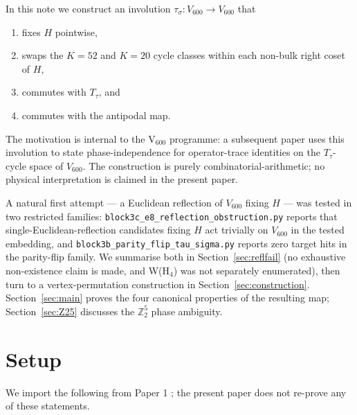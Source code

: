 \documentclass[11pt]{article}
\newcommand{\Vsixhundred}{V_{600}}
\newcommand{\sigmaG}{\sigma}
\newcommand{\tausigma}{\tau_{\!\sigmaG}}
\newcommand{\Ttau}{T_{\tau}}
\begin{document}
In this note we construct an involution
$\tausigma : \Vsixhundred \to \Vsixhundred$ that

\begin{enumerate}[leftmargin=2em]
\item fixes $H$ pointwise,
\item swaps the $K=52$ and $K=20$ cycle classes within each non-bulk
right coset of $H$,
\item commutes with $\Ttau$, and
\item commutes with the antipodal map.
\end{enumerate}

The motivation is internal to the V$_{600}$ programme: a subsequent
paper uses this involution to state phase-independence for
operator-trace identities on the $\Ttau$-cycle space of
$\Vsixhundred$. The construction is purely combinatorial-arithmetic;
no physical interpretation is claimed in the present paper.

A natural first attempt — a Euclidean reflection of $\Vsixhundred$
fixing $H$ — was tested in two restricted families:
\texttt{block3c\_e8\_reflection\_obstruction.py} reports that
single-Euclidean-reflection candidates fixing $H$ act trivially on
$\Vsixhundred$ in the tested embedding, and
\texttt{block3b\_parity\_flip\_tau\_sigma.py} reports zero
target hits in the parity-flip family. We summarise both in
Section~\ref{sec:reflfail} (no exhaustive non-existence claim is made,
and W(H$_4$) was not separately enumerated), then turn to a
vertex-permutation construction in Section~\ref{sec:construction}. Section~\ref{sec:main}
proves the four canonical properties of the resulting map; Section~\ref{sec:Z25}
discusses the $\mathbb{Z}_2^5$ phase ambiguity.

\section{Setup}\label{sec:setup}

We import the following from Paper 1 \citep{V600Paper1}; the present
paper does not re-prove any of these statements.
\end{document}

